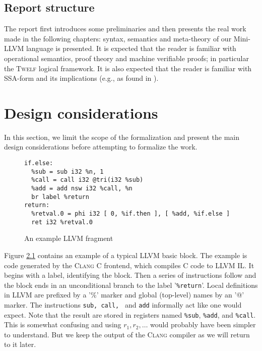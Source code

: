 \documentclass[a4paper, oneside, 10pt, final]{memoir}
\newcommand{\clang}{\textsc{Clang}}
\newcommand{\twelf}{\textsc{Twelf}}
\begin{document}
\section{Report structure}

The report first introduces some preliminaries and then presents the
real work made in the following chapters: syntax, semantics and
meta-theory of our Mini-LLVM language is presented. It is expected
that the reader is familiar with operational semantics, proof theory
and machine verifiable proofs; in particular the \twelf{} logical
framework. It is also expected that the reader is familiar with
SSA-form and its implications (e.g., as found in
\cite[Chapter 19]{appel:1998:modern}).

\chapter{Design considerations}

In this section, we limit the scope of the formalization and present
the main design considerations before attempting to formalize the work.

\begin{figure}
\begin{verbatim}
if.else:
  %sub = sub i32 %n, 1
  %call = call i32 @tri(i32 %sub)
  %add = add nsw i32 %call, %n
  br label %return
return:
  %retval.0 = phi i32 [ 0, %if.then ], [ %add, %if.else ]
  ret i32 %retval.0

\end{verbatim}
  \caption{An example LLVM fragment}
  \label{fig:llvm-example-1}
\end{figure}

Figure \ref{fig:llvm-example-1} contains an example of a typical LLVM
basic block. The example is code generated by the \clang{} C frontend,
which compiles C code to LLVM IL. It begins with a label, identifying
the block. Then a series of instructions follow and the block ends in
an unconditional branch to the label '\texttt{\%return}'. Local
definitions in LLVM are prefixed by a '\%' marker and global
(top-level) names by an '@' marker. The instructions \texttt{sub,
  call, } and \texttt{add} informally act like one would expect. Note
that the result are stored in registers named \texttt{\%sub},
\texttt{\%add}, and \texttt{\%call}. This is somewhat confusing and
using $r_1, r_2, \dotsc$ would probably have been simpler to
understand. But we keep the output of the \clang{} compiler as we will
return to it later.
\end{document}
